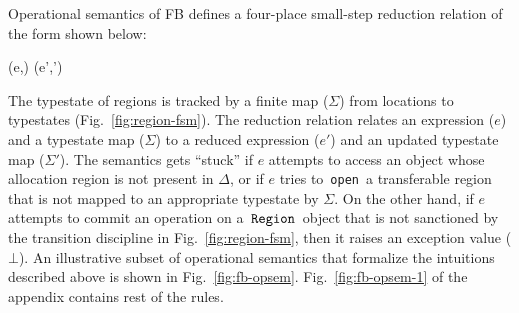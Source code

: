 \documentclass[a4paper,UKenglish]{lipics-v2018}
\newcommand{\C}[1]{\code{#1}}
\newcommand{\code}[1]{\,{\tt #1}\,}
\newcommand{\spc}[0]{\quad}
\newcommand{\FB}{{\sc FB}\xspace}
\newcommand{\RgnZ}{\C{Region}}
\newcommand{\inang}[1]{\langle #1 \rangle}
\newcommand{\ralloc}{\pi^a}
\newcommand{\tbar}{\bar{T}}
\renewcommand{\bar}[1]{\overline{#1}}
\newcommand{\rhoenv}{\Delta}
\newcommand{\invalidexn}{\bot}
\newcommand{\redstoo}[3]{#2 \longrightarrow #3} %
\newcommand{\loc}{\mathtt{l}}
\newcommand{\locbar}{\overline{\loc}}
\newcommand{\mem}{\Sigma}
\newcommand{\rulelabel}[1]{\textrm{\sc {#1}}}
\newcommand{\RULE}[2]{\frac{\begin{array}{c}#1\end{array}}
                           {\begin{array}{c}#2\end{array}}}
\newenvironment{nop}{}{}
\newenvironment{smathpar}{
\begin{nop}\small\begin{mathpar}}{
\end{mathpar}\end{nop}\ignorespacesafterend}
\begin{document}
Operational semantics of \FB defines a four-place small-step reduction
relation of the form shown below:
\begin{smathpar}
  \redstoo{\rhoenv}{(e,\mem)}{(e',\mem')}
\end{smathpar}
The typestate of regions is tracked by a finite map ($\mem$) from
locations to typestates (Fig.~\ref{fig:region-fsm}). The reduction
relation relates an expression ($e$) and a typestate map ($\mem$) to a
reduced expression ($e'$) and an updated typestate map ($\mem'$). The
semantics gets ``stuck'' if $e$ attempts to access an object whose
allocation region is not present in $\rhoenv$, or if $e$ tries to
\C{open} a transferable region that is not mapped to an appropriate
typestate by $\mem$.  On the other hand, if $e$ attempts to commit an
operation on a $\RgnZ$ object that is not sanctioned by the transition
discipline in Fig.~\ref{fig:region-fsm}, then it raises an exception
value ($\invalidexn$). An illustrative subset of operational semantics
that formalize the intuitions described above is shown in
Fig.~\ref{fig:fb-opsem}.  Fig.~\ref{fig:fb-opsem-1} of the appendix
contains rest of the rules. 

\newcommand{\opsemrule}[3]{%
\begin{minipage}{#1}\begin{smathpar}\begin{array}{c}%
\renewcommand*{\arraystretch}{1.2}%
\RULE {#2} {#3}%
\end{array}\end{smathpar}\end{minipage}%
}

\newcommand{\lopsemrule}[4]{%
\begin{minipage}{#1}\begin{smathpar}\begin{array}{c}%
\renewcommand*{\arraystretch}{1.2}%
[\rulelabel{#4}] \spc \RULE {#2} {#3}%
\end{array}\end{smathpar}\end{minipage}%
}
%
\newcommand{\anobjty}[0]{B\inang{\tbar}\inang{\ralloc\locbar}}
\newcommand{\anobj}[0]{\C{new} \; \anobjty(\bar{v})}
%
\end{document}
